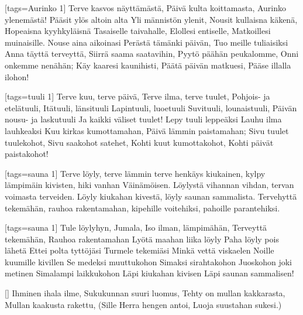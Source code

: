[tags={Aurinko 1}]
  \beginverse
    Terve kasvos näyttämästä,
    Päivä kulta koittamasta,
    Aurinko ylenemästä!
    Pääsit ylös altoin alta
    Yli männistön ylenit,
    Nousit kullaisna käkenä,
    Hopeaisna kyyhkyläisnä
    Tasaiselle taivahalle,
    Elollesi entiselle,
    Matkoillesi muinaisille.
  \endverse
  \beginverse
    Nouse aina aikoinasi
    Perästä tämänki päivän,
    Tuo meille tuliaisiksi
    Anna täyttä terveyttä,
    Siirrä saama saatavihin,
    Pyytö päähän peukalomme,
    Onni onkemme nenähän;
    Käy kaaresi kaunihisti,
    Päätä päivän matkuesi,
    Pääse illalla ilohon!
  \endverse
\endsong


[tags={tuuli 1}]
  \beginverse
    Terve kuu, terve päivä,
    Terve ilma, terve tuulet,
    Pohjois- ja etelätuuli,
    Itätuuli, länsituuli
    Lapintuuli, luoetuuli
    Suvituuli, lounaistuuli,
    Päivän nousu- ja laskutuuli
    Ja kaikki väliset tuulet!
    Lepy tuuli leppeäksi
    Lauhu ilma lauhkeaksi
    Kuu kirkas kumottamahan,
    Päivä lämmin paistamahan;
    Sivu tuulet tuulekohot,
    Sivu saakohot satehet,
    Kohti kuut kumottakohot,
    Kohti päivät paistakohot!
  \endverse
\endsong


[tags={sauna 1}]
  \beginverse
    Terve löyly, terve lämmin
    terve henkäys kiukainen,
    kylpy lämpimäin kivisten,
    hiki vanhan Väinämöisen.
    Löylystä vihannan vihdan,
    tervan voimasta terveiden.
  \endverse
  \beginverse
    Löyly kiukahan kivestä,
    löyly saunan sammalista.
    Tervehyttä tekemähän,
    rauhoa rakentamahan,
    kipehille voitehiksi,
    pahoille parantehiksi.
  \endverse
\endsong


[tags={sauna 1}]
  \beginverse
    Tule löylyhyn, Jumala,
    Iso ilman, lämpimähän,
    Terveyttä tekemähän,
    Rauhoa rakentamahan
  \endverse
  \beginverse
    Lyötä maahan liika löyly
    Paha löyly pois lähetä
    Ettei polta tyttöjäsi
    Turmele tekemiäsi
  \endverse
  \beginverse
    Minkä vettä viskaelen
    Noille kuumille kivillen
    Se medeksi muuttukohon
    Simaksi sirahtakohon
  \endverse
  \beginverse
    Juoskohon joki metinen
    Simalampi laikkukohon
    Läpi kiukahan kivisen
    Läpi saunan sammalisen!
  \endverse
\endsong


[]
  \beginverse
    Ihminen ihala ilme,
    Sukukunnan suuri luomus,
    Tehty on mullan kakkarasta,
    Mullan kaakusta rakettu,
    (Sille Herra hengen antoi,
    Luoja suustahan sukesi.)
  \endverse
\endsong


